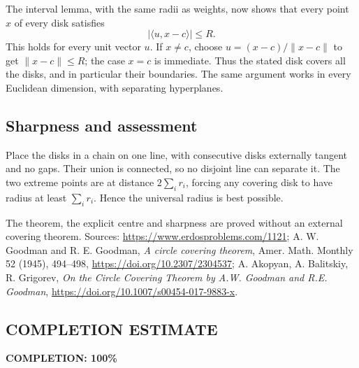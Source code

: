 The interval lemma, with the same radii as weights, now shows that every point $x$ of every disk satisfies
\[
 |\langle u,x-c\rangle|\le R.
\]
This holds for every unit vector $u$. If $x\ne c$, choose $u=(x-c)/\|x-c\|$ to get $\|x-c\|\le R$; the case $x=c$ is immediate. Thus the stated disk covers all the disks, and in particular their boundaries. The same argument works in every Euclidean dimension, with separating hyperplanes.

\subsection*{Sharpness and assessment}
Place the disks in a chain on one line, with consecutive disks externally tangent and no gaps. Their union is connected, so no disjoint line can separate it. The two extreme points are at distance $2\sum_i r_i$, forcing any covering disk to have radius at least $\sum_i r_i$. Hence the universal radius is best possible.

The theorem, the explicit centre and sharpness are proved without an external covering theorem. Sources: \url{https://www.erdosproblems.com/1121}; A. W. Goodman and R. E. Goodman, \emph{A circle covering theorem}, Amer. Math. Monthly 52 (1945), 494--498, \url{https://doi.org/10.2307/2304537}; A. Akopyan, A. Balitskiy, R. Grigorev, \emph{On the Circle Covering Theorem by A.W. Goodman and R.E. Goodman}, \url{https://doi.org/10.1007/s00454-017-9883-x}.
\subsection*{COMPLETION ESTIMATE}
\textbf{COMPLETION: 100\%}
